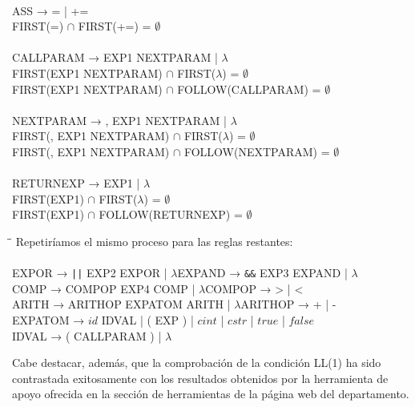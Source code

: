 \begin{tabbing}
    \\
    ASS → = | +=\\
    \>FIRST(=) $\cap$ FIRST(+=) = $\emptyset$\\
    \\
    CALLPARAM → EXP1 NEXTPARAM | $\lambda$\\
    \>FIRST(EXP1 NEXTPARAM) $\cap$ FIRST($\lambda$) = $\emptyset$\\
    \>FIRST(EXP1 NEXTPARAM) $\cap$ FOLLOW(CALLPARAM) = $\emptyset$\\
    \\
    NEXTPARAM → , EXP1 NEXTPARAM | $\lambda$\\
    \>FIRST(, EXP1 NEXTPARAM) $\cap$ FIRST($\lambda$) = $\emptyset$\\
    \>FIRST(, EXP1 NEXTPARAM) $\cap$ FOLLOW(NEXTPARAM) = $\emptyset$\\
    \\
    RETURNEXP → EXP1 | $\lambda$\\
    \>FIRST(EXP1) $\cap$ FIRST($\lambda$) = $\emptyset$\\
    \>FIRST(EXP1) $\cap$ FOLLOW(RETURNEXP) = $\emptyset$\\
\end{tabbing}
\begin{tabbing}
    \hspace{0.5cm}\=\hspace{10cm}\=\kill
    Repetiríamos el mismo proceso para las reglas restantes:\\
    \\
    \>EXPOR → \verb!||! EXP2 EXPOR | $\lambda$\>EXPAND → \verb!&&! EXP3 EXPAND | $\lambda$\\
    \>COMP → COMPOP EXP4 COMP | $\lambda$\>COMPOP → > | <\\
    \>ARITH → ARITHOP EXPATOM ARITH | $\lambda$\>ARITHOP → + | -\\
    \>EXPATOM → $id$ IDVAL | ( EXP ) | $cint$ | $cstr$ | $true$ | $false$\\
    \>IDVAL → ( CALLPARAM ) | $\lambda$
\end{tabbing}
Cabe destacar, además, que la comprobación de la condición LL(1) ha sido contrastada exitosamente con los resultados obtenidos por la herramienta de apoyo ofrecida en la sección de herramientas de la página web del departamento.\\
\newpage